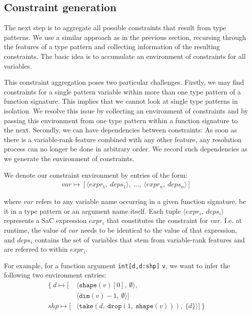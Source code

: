 
\subsection{Constraint generation}\label{sec:gtc}

The next step is to aggregate all possible constraints that result from type patterns.
We use a similar approach as in the previous section, recursing through the features of a type pattern and collecting information of the resulting constraints.
The basic idea is to accumulate an environment of constraints for all variables.

This constraint aggregation poses two particular challenges.
Firstly, we may find constraints for a single pattern variable within more than one type pattern of a function signature.
This implies that we cannot look at single type patterns in isolation.
We resolve this issue by collecting an environment of constraints and by passing this environment from one type pattern within a function signature to the next.
Secondly, we can have dependencies between constraints:
As soon as there is a variable-rank feature combined with any other feature, any resolution process can no longer be done in arbitrary order. We record such dependencies as we generate the environment of constraints.

We denote our constraint environment by entries of the form:
\begin{align*}
    var \mapsto [\langle{}expr_1,\ deps_1\rangle,\ \dots,\ \langle{}expr_n,\ deps_n\rangle]
\end{align*}

\noindent
where $var$ refers to any variable name occurring in a given function signature, be it in a type pattern or an argument name itself.
Each tuple $\langle{} expr_i,\ deps_i \rangle$ represents a SaC expression $expr_i$ that constitutes the constraint for $var$.
I.e. at runtime, the value of $var$ needs to be identical to the value of that expression, and $deps_i$ contains the set of variables that stem from variable-rank features and are referred to within $expr_i$.

For example, for a function argument \texttt{int[d,d:shp]} \texttt{v}, we want to infer the following two environment entries:
\begin{align*}
    \mathbf{\{}\ 
        d   \mapsto [&\langle\texttt{shape}(v)[0],\ \emptyset\rangle, \\
                     &\langle\texttt{dim}(v)-1,\ \emptyset\rangle] \\
        shp \mapsto [&\langle\texttt{take}(d,\ \texttt{drop}(1,\ \texttt{shape}(v))),\ \{d\}\rangle]
    \ \mathbf{\}}
\end{align*}

